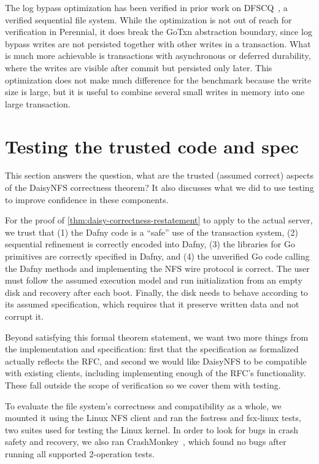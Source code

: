 The log bypass optimization has been verified in prior work on
DFSCQ~\cite{chen:dfscq}, a verified sequential file system. While the
optimization is not out of reach for verification in Perennial, it does break
the GoTxn abstraction boundary, since log bypass writes are not persisted
together with other writes in a transaction. What is much more achievable is
transactions with asynchronous or deferred durability, where the writes are
visible after commit but persisted only later. This optimization does not make
much difference for the  benchmark because the write size is
large, but it is useful to combine several small writes in memory into one large
transaction.

\section{Testing the trusted code and spec}
\label{sec:eval:testing}

This section answers the question, what are the trusted (assumed correct)
aspects of the DaisyNFS correctness theorem? It also discusses what we did to
use testing to improve confidence in these components.

For the proof of \cref{thm:daisy-correctness-restatement} to apply to the actual server, we trust that (1) the
Dafny code is a ``safe'' use of the transaction system, (2) sequential
refinement is correctly encoded into Dafny, (3) the libraries for Go primitives
are correctly specified in Dafny, and (4) the unverified Go code calling the
Dafny methods and implementing the NFS wire protocol is correct. The
user must follow the assumed execution model and run initialization from an
empty disk and recovery after each boot. Finally, the disk needs to behave
according to its assumed specification, which requires that it preserve written
data and not corrupt it.

Beyond satisfying this formal theorem statement, we want two more things from
the implementation and specification: first that the specification as formalized
actually reflects the RFC, and second we would like DaisyNFS to be compatible
with existing clients, including implementing enough of the RFC's functionality.
These fall outside the scope of verification so we cover them with testing.

To evaluate the file system's correctness and compatibility as a whole, we
mounted it using the Linux NFS client and ran the fsstress and fsx-linux tests,
two suites used for testing the Linux kernel. In order to look for bugs in crash
safety and recovery, we also ran CrashMonkey~\cite{mohan:crashmonkey}, which
found no bugs after running all supported 2-operation tests.

